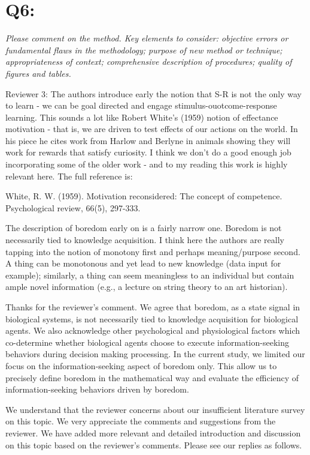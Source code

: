 \documentclass[utf8]{article}
\newenvironment{reply}  
    {\color{Blue}\noindent\newline}
    {\newline}
\begin{document}
    \section*{Q6:}
        \textit{Please comment on the method. Key elements to consider: objective errors or fundamental flaws in the methodology; purpose of new method or technique; appropriateness of context; comprehensive description of procedures; quality of figures and tables.}\newline
        
        Reviewer 3:
        The authors introduce early the notion that S-R is not the only way to learn - we can be goal directed and engage stimulus-ouotcome-response learning. This sounds a lot like Robert White's (1959) notion of effectance motivation - that is, we are driven to test effects of our actions on the world. In his piece he cites work from Harlow and Berlyne in animals showing they will work for rewards that satisfy curiosity. I think we don't do a good enough job incorporating some of the older work - and to my reading this work is highly relevant here. The full reference is:
        
        White, R. W. (1959). Motivation reconsidered: The concept of competence. Psychological review, 66(5), 297-333.
         
        The description of boredom early on is a fairly narrow one. Boredom is not necessarily tied to knowledge acquisition. I think here the authors are really tapping into the notion of monotony first and perhaps meaning/purpose second. A thing can be monotonous and yet lead to new knowledge (data input for example); similarly, a thing can seem meaningless to an individual but contain ample novel information (e.g., a lecture on string theory to an art historian). 
        
        \begin{reply}
            Thanks for the reviewer's comment. We agree that boredom, as a state signal in biological systems, is not necessarily tied to knowledge acquisition for biological agents. We also acknowledge other psychological and physiological factors which co-determine whether biological agents choose to execute information-seeking behaviors during decision making processing. In the current study, we limited our focus on the information-seeking aspect of boredom only. This allow us to precisely define boredom in the mathematical way and evaluate the efficiency of information-seeking behaviors driven by boredom.
            
            We understand that the reviewer concerns about our insufficient literature survey on this topic. We very appreciate the comments and suggestions from the reviewer. We have added more relevant and detailed introduction and discussion on this topic based on the reviewer's comments. Please see our replies as follows. 
        \end{reply}
        
\end{document}
